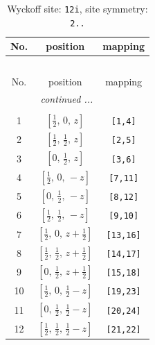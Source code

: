 \documentclass[fleqn,8pt]{jsarticle}
\begin{document}
\begin{longtable}{ccc}
\caption{Wyckoff site: {\tt 12i}, site symmetry: {\tt 2..}}
 \\
 \hline \hline
No. & position & mapping \\ \hline \endfirsthead

\multicolumn{2}{l}{\tablename\ \thetable{}} \\
 \hline \hline
No. & position & mapping \\ \hline \endhead

 \hline \hline
\multicolumn{2}{r}{\footnotesize\it continued ...} \\ \endfoot

 \hline \hline
\multicolumn{2}{r}{} \\ \endlastfoot

1 & $\left[ \frac{1}{2},\, 0,\, z \right]$ & {\tt [1,4]} \\ \hline
2 & $\left[ \frac{1}{2},\, \frac{1}{2},\, z \right]$ & {\tt [2,5]} \\ \hline
3 & $\left[ 0,\, \frac{1}{2},\, z \right]$ & {\tt [3,6]} \\ \hline
4 & $\left[ \frac{1}{2},\, 0,\, - z \right]$ & {\tt [7,11]} \\ \hline
5 & $\left[ 0,\, \frac{1}{2},\, - z \right]$ & {\tt [8,12]} \\ \hline
6 & $\left[ \frac{1}{2},\, \frac{1}{2},\, - z \right]$ & {\tt [9,10]} \\ \hline
7 & $\left[ \frac{1}{2},\, 0,\, z + \frac{1}{2} \right]$ & {\tt [13,16]} \\ \hline
8 & $\left[ \frac{1}{2},\, \frac{1}{2},\, z + \frac{1}{2} \right]$ & {\tt [14,17]} \\ \hline
9 & $\left[ 0,\, \frac{1}{2},\, z + \frac{1}{2} \right]$ & {\tt [15,18]} \\ \hline
10 & $\left[ \frac{1}{2},\, 0,\, \frac{1}{2} - z \right]$ & {\tt [19,23]} \\ \hline
11 & $\left[ 0,\, \frac{1}{2},\, \frac{1}{2} - z \right]$ & {\tt [20,24]} \\ \hline
12 & $\left[ \frac{1}{2},\, \frac{1}{2},\, \frac{1}{2} - z \right]$ & {\tt [21,22]} \\
\end{longtable}
\renewcommand{\arraystretch}{1.2}
\end{document}
